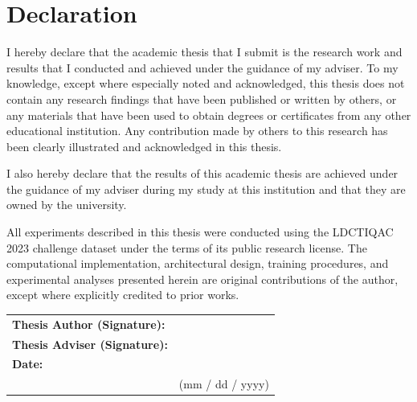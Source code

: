 \chapter*{Declaration}

\vspace{1cm}

I hereby declare that the academic thesis that I submit is the research
work and results that I conducted and achieved under the guidance of my
adviser. To my knowledge, except where especially noted and acknowledged,
this thesis does not contain any research findings that have been
published or written by others, or any materials that have been used to
obtain degrees or certificates from any other educational institution.
Any contribution made by others to this research has been clearly
illustrated and acknowledged in this thesis.

\vspace{0.5cm}

I also hereby declare that the results of this academic thesis are
achieved under the guidance of my adviser during my study at this
institution and that they are owned by the university.

All experiments described in this thesis were conducted using the LDCTIQAC 2023 challenge
dataset under the terms of its public research license. The computational implementation,
architectural design, training procedures, and experimental analyses presented herein are
original contributions of the author, except where explicitly credited to prior works.

\vspace{3cm}

\noindent
\begin{tabular}{ll}
  \textbf{Thesis Author (Signature):}  & \underline{\hspace{6cm}} \\[1.5cm]
  \textbf{Thesis Adviser (Signature):} & \underline{\hspace{6cm}} \\[1.5cm]
  \textbf{Date:}                       & \underline{\hspace{6cm}} \\[1cm]
                                       & (mm / dd / yyyy) \\
\end{tabular}
